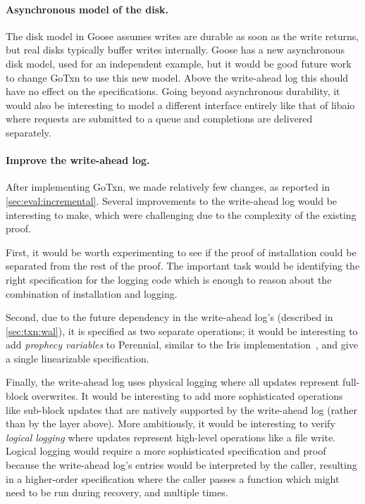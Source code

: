 \paragraph{Asynchronous model of the disk.} The disk model in Goose assumes
writes are durable as soon as the write returns, but real disks typically buffer
writes internally. Goose has a new asynchronous disk model, used for an
independent example, but it would be good future work to change GoTxn to use
this new model. Above the write-ahead log this should have no effect on the
specifications. Going beyond asynchronous durability, it would also be
interesting to model a different interface entirely like that of libaio where
requests are submitted to a queue and completions are delivered separately.

\paragraph{Improve the write-ahead log.} After implementing GoTxn, we made
relatively few changes, as reported in \cref{sec:eval:incremental}. Several
improvements to the write-ahead log would be interesting to make, which were
challenging due to the complexity of the existing proof.

First, it would be worth experimenting to see if the proof of installation could
be separated from the rest of the proof. The important task would be identifying
the right specification for the logging code which is enough to reason about the
combination of installation and logging.

Second, due to the future dependency in the write-ahead log's 
(described in \cref{sec:txn:wal}), it is specified as two separate
operations; it would be interesting to add \emph{prophecy variables} to
Perennial, similar to the Iris implementation~\cite{jung:prophecy}, and give
 a single linearizable specification.

Finally, the write-ahead log uses physical logging where all updates represent
full-block overwrites. It would be interesting to add more sophisticated
operations like sub-block updates that are natively supported by the write-ahead
log (rather than by the layer above). More ambitiously, it would be interesting
to verify \emph{logical logging} where updates represent high-level operations
like a file write. Logical logging would require a more sophisticated
specification and proof because the write-ahead log's entries would be
interpreted by the caller, resulting in a higher-order specification where the
caller passes a function which might need to be run during recovery, and
multiple times.

